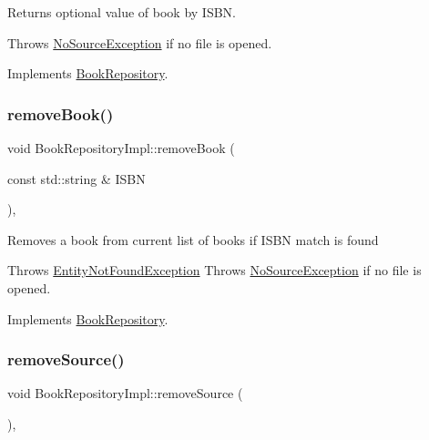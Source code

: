 Returns optional value of book by I\+S\+BN.

Throws \hyperlink{structNoSourceException}{No\+Source\+Exception} if no file is opened. 

Implements \hyperlink{classBookRepository_a0334aacb95e6bd4ff7477b9b9ba1e72f}{Book\+Repository}.

\mbox{\label{classBookRepositoryImpl_aefed48951263bb21153b24fd7bcf0e1c}} 
\subsubsection{\texorpdfstring{remove\+Book()}{removeBook()}}
{\footnotesize\ttfamily void Book\+Repository\+Impl\+::remove\+Book (\begin{DoxyParamCaption}\item[{const std\+::string \&}]{I\+S\+BN }\end{DoxyParamCaption})\hspace{0.3cm}{\ttfamily [override]}, {\ttfamily [virtual]}}

Removes a book from current list of books if I\+S\+BN match is found

Throws \hyperlink{structEntityNotFoundException}{Entity\+Not\+Found\+Exception} Throws \hyperlink{structNoSourceException}{No\+Source\+Exception} if no file is opened. 

Implements \hyperlink{classBookRepository_a2e0c4e643ea43750b99c2a380dc1e43d}{Book\+Repository}.

\mbox{\label{classBookRepositoryImpl_a1550bae55aa379da68b4391bcc0648eb}} 
\subsubsection{\texorpdfstring{remove\+Source()}{removeSource()}}
{\footnotesize\ttfamily void Book\+Repository\+Impl\+::remove\+Source (\begin{DoxyParamCaption}{ }\end{DoxyParamCaption})\hspace{0.3cm}{\ttfamily [override]}, {\ttfamily [virtual]}}


